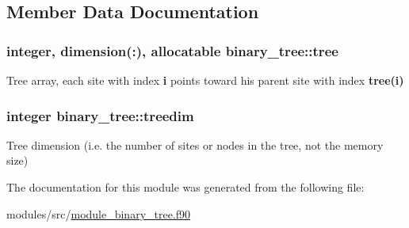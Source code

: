 \subsection{\-Member \-Data \-Documentation}
\hypertarget{classbinary__tree_abdb595cef78ddee3138beca3b9913019}{
\subsubsection[{tree}]{\setlength{\rightskip}{0pt plus 5cm}integer, dimension(\-:), allocatable {\bf binary\-\_\-tree\-::tree}}}
\label{classbinary__tree_abdb595cef78ddee3138beca3b9913019}


\-Tree array, each site with index {\bfseries i} points toward his parent site with index {\bfseries tree(i)} 

\hypertarget{classbinary__tree_a9fab803f212d6a162cc702c8bc36b60c}{
\subsubsection[{treedim}]{\setlength{\rightskip}{0pt plus 5cm}integer {\bf binary\-\_\-tree\-::treedim}}}
\label{classbinary__tree_a9fab803f212d6a162cc702c8bc36b60c}


\-Tree dimension (i.\-e. the number of sites or nodes in the tree, not the memory size) 



\-The documentation for this module was generated from the following file\-:\begin{DoxyCompactItemize}
\item 
modules/src/\hyperlink{module__binary__tree_8f90}{module\-\_\-binary\-\_\-tree.\-f90}\end{DoxyCompactItemize}
